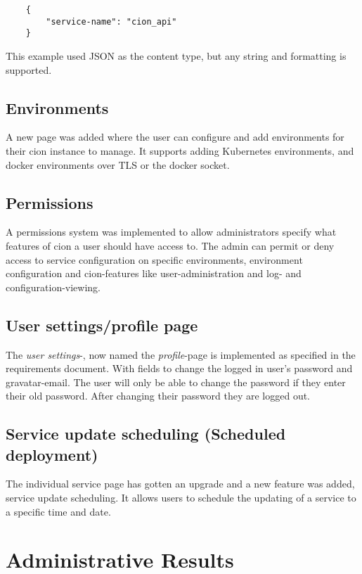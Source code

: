 \begin{verbatim}
    {
        "service-name": "cion_api"
    }
\end{verbatim}

This example used JSON as the content type, but any string and formatting is supported. 

\subsection{Environments}
A new page was added where the user can configure and add environments for their cion instance to manage. It supports adding Kubernetes environments, and docker environments over TLS or the docker socket.


\subsection{Permissions}
A permissions system was implemented to allow administrators specify what features of cion a user should have access to. The admin can permit or deny access to service configuration on specific environments, environment configuration and cion-features like user-administration and log- and configuration-viewing.


\subsection{User settings/profile page}
The \textit{user settings}-, now named the \textit{profile}-page is implemented as specified in the requirements document. With fields to change the logged in user's password and gravatar-email. The user will only be able to change the password if they enter their old password. After changing their password they are logged out. 

\subsection{Service update scheduling (Scheduled deployment)}
The individual service page has gotten an upgrade and a new feature was added, service update scheduling. It allows users to schedule the updating of a service to a specific time and date.


\section{Administrative Results}

